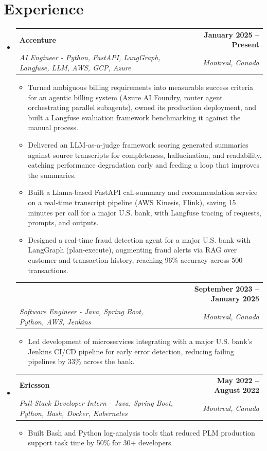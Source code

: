 \documentclass[letterpaper,11pt]{article}
\makeatletter
\newcommand{\resumeItem}[1]{
  \item\small{{#1 \vspace{-2pt}}}
}
\newcommand{\resumeSubheading}[4]{
  \vspace{-2pt}\item
    \begin{tabular*}{1.0\textwidth}[t]{l@{\extracolsep{\fill}}r}
      \textbf{#1} & \textbf{\small #2} \\
      \textit{\small#3} & \textit{\small #4} \\
    \end{tabular*}\vspace{-7pt}
}
\newcommand{\resumeSubheadingContinued}[3]{
  \vspace{4pt}
    \begin{tabular*}{1.0\textwidth}[t]{l@{\extracolsep{\fill}}r}
      & \textbf{\small #2} \\
      \textit{\small#1} & \textit{\small #3} \\
    \end{tabular*}\vspace{-7pt}
}
\newcommand{\resumeSubHeadingListStart}{\begin{itemize}[leftmargin=0.0in, label={}]}
\newcommand{\resumeSubHeadingListEnd}{\end{itemize}}
\newcommand{\resumeItemListStart}{\begin{itemize}}
\newcommand{\resumeItemListEnd}{\end{itemize}\vspace{-5pt}}
\makeatother
\begin{document}
\section{Experience}
  \resumeSubHeadingListStart

    \resumeSubheading
      {Accenture}{January 2025 -- Present}
      {AI Engineer - Python, FastAPI, LangGraph, Langfuse, LLM, AWS, GCP, Azure}{Montreal, Canada}
      \resumeItemListStart
        \resumeItem{Turned ambiguous billing requirements into measurable success criteria for an agentic billing system (Azure AI Foundry, router agent orchestrating parallel subagents), owned its production deployment, and built a Langfuse evaluation framework benchmarking it against the manual process.}
        \resumeItem{Delivered an LLM-as-a-judge framework scoring generated summaries against source transcripts for completeness, hallucination, and readability, catching performance degradation early and feeding a loop that improves the summaries.}
        \resumeItem{Built a Llama-based FastAPI call-summary and recommendation service on a real-time transcript pipeline (AWS Kinesis, Flink), saving 15 minutes per call for a major U.S. bank, with Langfuse tracing of requests, prompts, and outputs.}
        \resumeItem{Designed a real-time fraud detection agent for a major U.S. bank with LangGraph (plan-execute), augmenting fraud alerts via RAG over customer and transaction history, reaching 96\% accuracy across 500 transactions.}
      \resumeItemListEnd
      \vspace{-8pt}

    \resumeSubheadingContinued
      {Software Engineer - Java, Spring Boot, Python, AWS, Jenkins}{September 2023 -- January 2025}{Montreal, Canada}
      \resumeItemListStart
        \resumeItem{Led development of microservices integrating with a major U.S. bank's Jenkins CI/CD pipeline for early error detection, reducing failing pipelines by 33\% across the bank.}
      \resumeItemListEnd

    \resumeSubheading
      {Ericsson}{May 2022 -- August 2022}
      {Full-Stack Developer Intern - Java, Spring Boot, Python, Bash, Docker, Kubernetes}{Montreal, Canada}
      \resumeItemListStart
        \resumeItem{Built Bash and Python log-analysis tools that reduced PLM production support task time by 50\% for 30+ developers.}
      \resumeItemListEnd

  \resumeSubHeadingListEnd
\vspace{-14pt}
\end{document}

